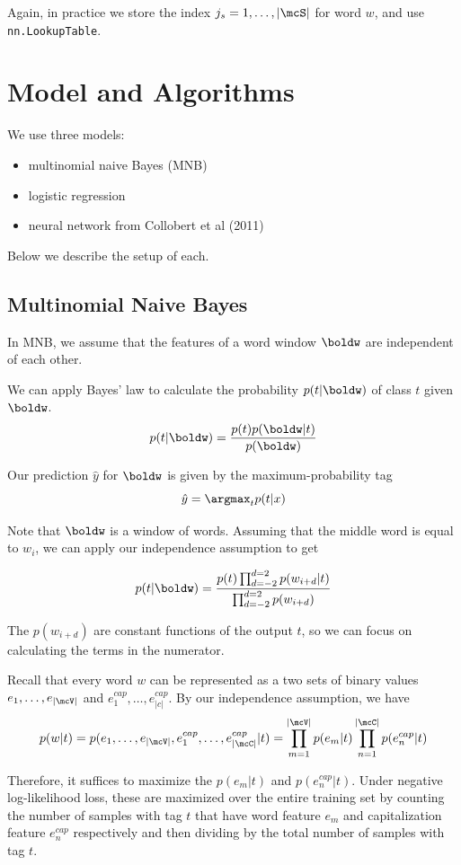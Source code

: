 \documentclass[11pt]{article}
\begin{document}
Again, in practice we store the index $j_s = 1, \ldots, |\mcS|$ for word $w$, and use \texttt{nn.LookupTable}.

\section{Model and Algorithms}

We use three models:
\begin{itemize}
  \item multinomial naive Bayes (MNB)
  \item logistic regression
  \item neural network from Collobert et al (2011)
\end{itemize}

Below we describe the setup of each.

\subsection{Multinomial Naive Bayes}

In MNB, we assume that the features of a word window $\boldw$ are independent of each other. 

We can apply Bayes' law to calculate the probability $p(t| \boldw)$ of class $t$ given $\boldw$. 
$$p(t| \boldw) = \frac{p(t)p(\boldw |t)}{p(\boldw)}$$

Our prediction $\hat{y}$ for $\boldw$ is given by the maximum-probability tag
$$\hat{y} = \argmax_{t} p(t | x)$$

Note that $\boldw$ is a window of words. Assuming that the middle word is equal to $w_i$, we can apply our independence assumption to get 

$$p(t | \boldw) = \frac{p(t)\prod_{d=-2}^{d=2} p(w_{i+d} | t)}{\prod_{d=-2}^{d=2} p(w_{i+d})}$$

The $p(w_{i+d})$ are constant functions of the output $t$, so we can focus on calculating the terms in the numerator. 

Recall that every word $w$ can be represented as a two sets of binary values $e_1, \dots, e_{|\mcV|}$ and $e^{cap}_1, \dots, e^{cap}_{|c|}$. By our independence assumption, we have 
$$p(w | t) = p(e_1, \dots, e_{|\mcV|}, e^{cap}_1, \dots, e^{cap}_{|\mcC|} | t) = \prod_{m=1}^{|\mcV|} p(e_m | t) \prod_{n=1}^{|\mcC|} p(e^{cap}_n | t)$$

Therefore, it suffices to maximize the $p(e_m | t)$ and $p(e^{cap}_n | t)$. Under negative log-likelihood loss, these are maximized over the entire training set by counting the number of samples with tag $t$ that have word feature $e_m$ and capitalization feature $e^{cap}_n$ respectively and then dividing by the total number of samples with tag $t$. 
\end{document}
